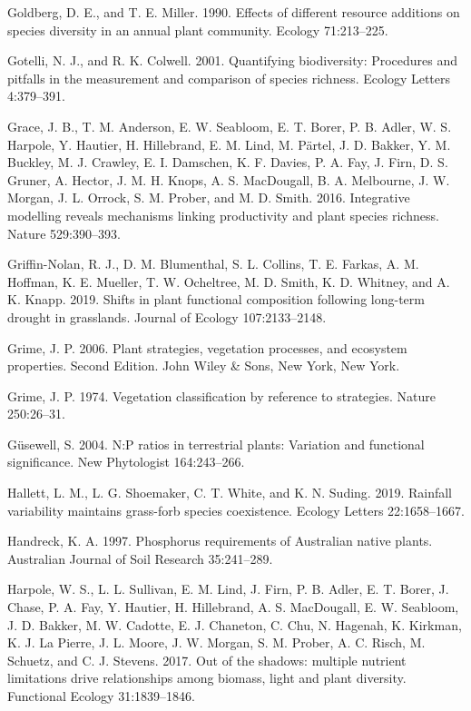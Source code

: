 \documentclass[twoside,12pt,final]{ucthesis-CA2012}
\newlength{\cslhangindent}
\newenvironment{cslreferences}%
  {\setlength{\parindent}{0pt}%
  \everypar{\setlength{\hangindent}{\cslhangindent}}\ignorespaces}%
  {\par}
\begin{document}
\begin{ucmainmatter}
\begin{cslreferences}
\leavevmode\hypertarget{ref-goldberg1990}{}%
Goldberg, D. E., and T. E. Miller. 1990. Effects of different resource additions on species diversity in an annual plant community. Ecology 71:213--225.

\leavevmode\hypertarget{ref-gotelli2001}{}%
Gotelli, N. J., and R. K. Colwell. 2001. Quantifying biodiversity: Procedures and pitfalls in the measurement and comparison of species richness. Ecology Letters 4:379--391.

\leavevmode\hypertarget{ref-Grace2016a}{}%
Grace, J. B., T. M. Anderson, E. W. Seabloom, E. T. Borer, P. B. Adler, W. S. Harpole, Y. Hautier, H. Hillebrand, E. M. Lind, M. Pärtel, J. D. Bakker, Y. M. Buckley, M. J. Crawley, E. I. Damschen, K. F. Davies, P. A. Fay, J. Firn, D. S. Gruner, A. Hector, J. M. H. Knops, A. S. MacDougall, B. A. Melbourne, J. W. Morgan, J. L. Orrock, S. M. Prober, and M. D. Smith. 2016. Integrative modelling reveals mechanisms linking productivity and plant species richness. Nature 529:390--393.

\leavevmode\hypertarget{ref-Griffin-Nolan2019}{}%
Griffin-Nolan, R. J., D. M. Blumenthal, S. L. Collins, T. E. Farkas, A. M. Hoffman, K. E. Mueller, T. W. Ocheltree, M. D. Smith, K. D. Whitney, and A. K. Knapp. 2019. Shifts in plant functional composition following long-term drought in grasslands. Journal of Ecology 107:2133--2148.

\leavevmode\hypertarget{ref-Grime2006}{}%
Grime, J. P. 2006. Plant strategies, vegetation processes, and ecosystem properties. Second Edition. John Wiley \& Sons, New York, New York.

\leavevmode\hypertarget{ref-Grime1974}{}%
Grime, J. P. 1974. Vegetation classification by reference to strategies. Nature 250:26--31.

\leavevmode\hypertarget{ref-Gusewell2004}{}%
Güsewell, S. 2004. N:P ratios in terrestrial plants: Variation and functional significance. New Phytologist 164:243--266.

\leavevmode\hypertarget{ref-hallett2019}{}%
Hallett, L. M., L. G. Shoemaker, C. T. White, and K. N. Suding. 2019. Rainfall variability maintains grass-forb species coexistence. Ecology Letters 22:1658--1667.

\leavevmode\hypertarget{ref-Handreck1997}{}%
Handreck, K. A. 1997. Phosphorus requirements of Australian native plants. Australian Journal of Soil Research 35:241--289.

\leavevmode\hypertarget{ref-Harpole2017}{}%
Harpole, W. S., L. L. Sullivan, E. M. Lind, J. Firn, P. B. Adler, E. T. Borer, J. Chase, P. A. Fay, Y. Hautier, H. Hillebrand, A. S. MacDougall, E. W. Seabloom, J. D. Bakker, M. W. Cadotte, E. J. Chaneton, C. Chu, N. Hagenah, K. Kirkman, K. J. La Pierre, J. L. Moore, J. W. Morgan, S. M. Prober, A. C. Risch, M. Schuetz, and C. J. Stevens. 2017. Out of the shadows: multiple nutrient limitations drive relationships among biomass, light and plant diversity. Functional Ecology 31:1839--1846.


\end{cslreferences}
\end{ucmainmatter}
\end{document}
